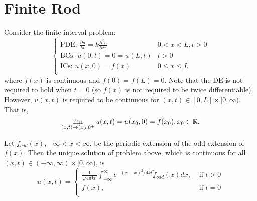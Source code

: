\documentclass[class=article,crop=false]{standalone}
\begin{document}
\section{Finite Rod}
Consider the finite interval problem:
\begin{equation*}
\begin{cases}
	\text{PDE: } \frac{\partial u}{\partial t} = k \frac{\partial^2 u}{\partial { x}^2}  & 0<x<L, t>0 \\
	\text{BCs: } u(0,t)=0=u(L,t) & t>0 \\
	\text{ICs: } u(x,0) =f(x) & 0 \leq x \leq L \\
\end{cases}
\end{equation*}
where $ f(x)$ is continuous and  $ f(0)=f(L)=0$. Note that the DE is not required to hold when  $ t=0$ (so  $ f(x)$ is not required to be twice differentiable). However,  $ u(x,t)$ is required to be continuous for  $ (x,t) \in [0,L]\times [0,\infty)$. That is,
\[
	\lim_{ (x,t) \to (x_0,0^+} u(x,t) = u(x_0,0) = f(x_0) , x_0 \in \rr 
.\] 
\begin{thm}
	Let $ \tilde{f}_{odd}(x), -\infty< x < \infty$, be the periodic extension of the odd extension of $ f(x)$. Then the unique solution of problem above, which is continuous for all  $(x,t) \in (-\infty, \infty) \times [0,\infty)$, is
	\begin{equation*}
		u(x,t)=
	\begin{cases}
		\frac{1}{\sqrt{4\pi k t} } \int_{-\infty}^{\infty} e^{-(x-\overline{x})^2 /4kt} \tilde{f}_{odd}(\overline{x}) d\overline{x}, & \text{ if } t>0\\
		f(x), & \text{ if } t=0\\ 
	\end{cases}
	\end{equation*}
\end{thm}
\end{document}
